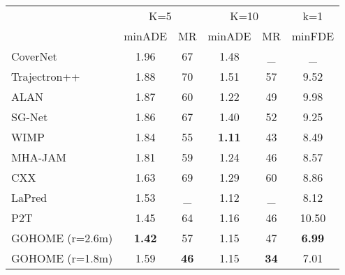 \documentclass[letterpaper, 10 pt, conference]{ieeeconf}
\begin{document}
\begin{table*}[b]
\begin{minipage}{.5\linewidth}
\begin{center}
\begin{tabular}{l|c c|c c| c}
      \hline
      & \multicolumn{2}{c|}{K=5}  & \multicolumn{2}{c}{K=10} & k=1  \\
      & minADE & MR & minADE  & MR & minFDE \\
      \hline
       CoverNet \cite{phan2020covernet}             & 1.96 & 67 &  1.48  & \_ & \_\\
      Trajectron++ \cite{salzmann2020trajectron++} & 1.88 & 70 &  1.51  & 57 & 9.52\\
      ALAN \cite{narayanan2021divide}              & 1.87 & 60 &  1.22  & 49 & 9.98\\
      SG-Net \cite{wang2021stepwise}               & 1.86 & 67 &  1.40  & 52 & 9.25\\
      WIMP \cite{khandelwal2020if}                 & 1.84 & 55 &  \textbf{1.11}  & 43 & 8.49\\
      MHA-JAM \cite{messaoud2020multi}             & 1.81 & 59 &  1.24  & 46 & 8.57\\
      CXX \cite{luo2020probabilistic}              & 1.63 & 69 &  1.29  & 60 & 8.86\\
      LaPred \cite{kim2021lapred}                  & 1.53 & \_ &  1.12  & \_ & 8.12\\
      P2T \cite{deo2020trajectory}                 & 1.45 & 64 &  1.16  & 46 & 10.50\\
\hline
      GOHOME (r=2.6m)                                       & \textbf{1.42} & 57 &  1.15 & 47 &  \textbf{6.99}\\
      GOHOME (r=1.8m)                              & 1.59 & \textbf{46} &  1.15  & \textbf{34} & 7.01\\
      \hline
      



      
      \hline
    \end{tabular}
    \end{center}
    \label{tab:nuscenes_test}
\end{minipage}
\end{table*}
\end{document}
